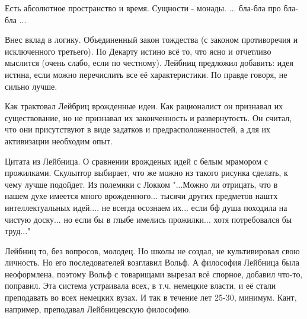 Есть абсолютное пространство и время. Сущности - монады. ... бла-бла про бла-бла ...

Внес вклад в логику. Объединенный закон тождества (с законом противоречия и исключенного третьего). По Декарту истино всё то, что ясно и отчетливо мыслится (очень слабо, если по честному). Лейбниц предложил добавить: идея истина, если можно перечислить все её характеристики. По правде говоря, не сильно лучше.

Как трактовал Лейбриц врожденные идеи. Как рационалист он признавал их существование, но не признавал их законченность и развернутость. Он считал, что они присутствуют в виде задатков и предрасположенностей, а для их активизации необходим опыт.

Цитата из Лейбница. О сравнении врожденых идей с белым мрамором с прожилками. Скульптор выбирает, что же можно из такого рисунка сделать, к чему лучше подойдет. Из полемики с Локком
"...Можно ли отрицать, что в нашем духе имеется много врожденного... тысячи других предметов наштх интеллектуальных идей.... не всегда осознаем их... если бф душа походила на чистую доску... но если бы в глыбе имелись прожилки... хотя потребовался бы труд..."

Лейбниц то, без вопросов, молодец. Но школы не создал, не культивировал свою личность. Но его последователей возглавил Вольф. А философия Лейбница была неоформлена, поэтому Вольф с товарищами вырезал всё спорное, добавил что-то, поправил. Эта система устраивала всех, в т.ч. немецкие власти, и её стали преподавать во всех немецких вузах. И так в течение лет 25-30, минимум. Кант, например, преподавал Лейбницевскую философию.
 